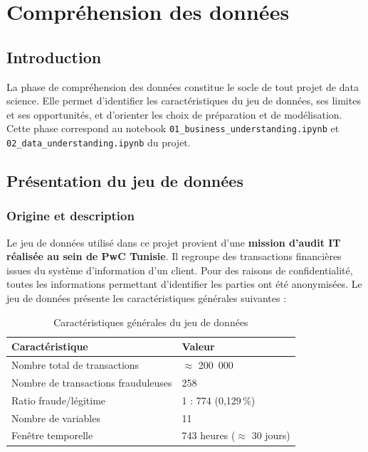 \documentclass[12pt,a4paper,twoside]{report}
\begin{document}
\chapter{Compréhension des données}

\section{Introduction}

La phase de compréhension des données constitue le socle de tout projet de data science. Elle permet d'identifier les caractéristiques du jeu de données, ses limites et ses opportunités, et d'orienter les choix de préparation et de modélisation. Cette phase correspond au notebook \texttt{01\_business\_understanding.ipynb} et \texttt{02\_data\_understanding.ipynb} du projet.

\section{Présentation du jeu de données}

\subsection{Origine et description}

Le jeu de données utilisé dans ce projet provient d'une \textbf{mission d'audit IT réalisée au sein de PwC Tunisie}. Il regroupe des transactions financières issues du système d'information d'un client. Pour des raisons de confidentialité, toutes les informations permettant d'identifier les parties ont été anonymisées. Le jeu de données présente les caractéristiques générales suivantes :

\begin{table}[H]
\centering
\caption{Caractéristiques générales du jeu de données}
\label{tab:dataset_overview}
\begin{tabular}{ll}
\toprule
\textbf{Caractéristique} & \textbf{Valeur} \\
\midrule
Nombre total de transactions & $\approx$ 200~000 \\
Nombre de transactions frauduleuses & 258 \\
Ratio fraude/légitime & 1 : 774 (0,129\,\%) \\
Nombre de variables & 11 \\
Fenêtre temporelle & 743 heures ($\approx$ 30 jours) \\
\bottomrule
\end{tabular}
\end{table}
\end{document}
